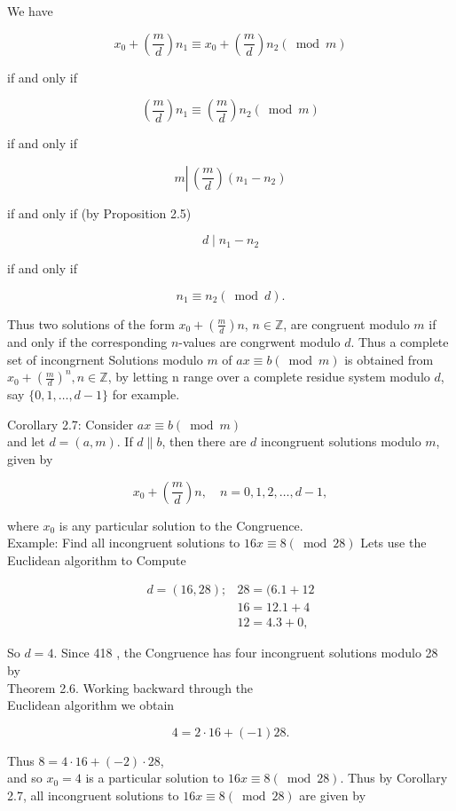 \documentclass[10pt]{article}
\begin{document}
We have

$$
x_{0}+\left(\frac{m}{d}\right) n_{1} \equiv x_{0}+\left(\frac{m}{d}\right) n_{2}(\bmod m)
$$

if and only if

$$
\left(\frac{m}{d}\right) n_{1} \equiv\left(\frac{m}{d}\right) n_{2}(\bmod m)
$$

if and only if

$$
m \left\lvert\,\left(\frac{m}{d}\right)\left(n_{1}-n_{2}\right)\right.
$$

if and only if (by Proposition 2.5)

$$
d \mid n_{1}-n_{2}
$$

if and only if

$$
n_{1} \equiv n_{2}(\bmod d) .
$$

Thus two solutions of the form $x_{0}+\left(\frac{m}{d}\right) n$, $n \in \mathbb{Z}$, are congruent modulo $m$ if and only if the corresponding $n$-values are congrwent modulo $d$. Thus a complete set of incongrnent Solutions modulo $m$ of $a x \equiv b(\bmod m)$ is obtained from $x_{0}+\left(\frac{m}{d}\right)^{n}, n \in \mathbb{Z}$, by letting n range over a complete residue system modulo $d$, say $\{0,1, \ldots, d-1\}$ for example.

Corollary 2.7: Consider $a x \equiv b(\bmod m)$\\
and let $d=(a, m)$. If $d \| b$, then there are $d$ incongruent solutions modulo $m$, given by

$$
x_{0}+\left(\frac{m}{d}\right) n, \quad n=0,1,2, \ldots, d-1,
$$

where $x_{0}$ is any particular solution to the Congruence.\\
Example: Find all incongruent solutions to $16 x \equiv 8(\bmod 28)$ Lets use the Euclidean algorithm to Compute

$$
\begin{aligned}
d=(16,28) ; & 28=(6.1+12 \\
& 16=12.1+4 \\
& 12=4.3+0,
\end{aligned}
$$

So $d=4$. Since 418 , the Congruence has four incongruent solutions modulo 28 by\\
Theorem 2.6. Working backward through the\\
Euclidean algorithm we obtain

$$
4=2 \cdot 16+(-1) 28 .
$$

Thus $8=4 \cdot 16+(-2) \cdot 28$,\\
and so $x_{0}=4$ is a particular solution to $16 x \equiv 8(\bmod 28)$. Thus by Corollary 2.7, all incongruent solutions to $16 x \equiv 8(\bmod 28)$ are given by
\end{document}
